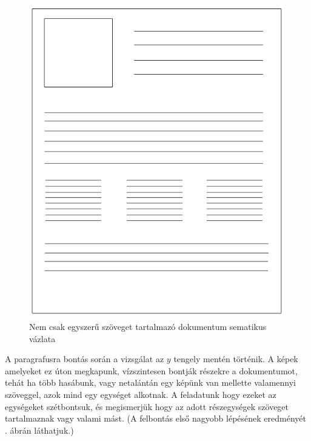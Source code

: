 \begin{figure}[h!]
\centering
\includegraphics[scale=0.8]{images/page.png}
\caption{Nem csak egyszerű szöveget tartalmazó dokumentum sematikus vázlata}
\label{fig:page}
\end{figure}

A paragrafusra bontás során a vizsgálat az $y$ tengely mentén történik. A képek amelyeket ez úton megkapunk, vízszintesen bontják részekre a dokumentumot, tehát ha több hasábunk, vagy netalántán egy képünk van mellette valamennyi szöveggel, azok mind egy egységet alkotnak. A feladatunk hogy ezeket az egységeket szétbontsuk, és megismerjük hogy az adott részegységek szöveget tartalmaznak vagy valami mást. (A felbontás első nagyobb lépésének eredményét . ábrán láthatjuk.)

